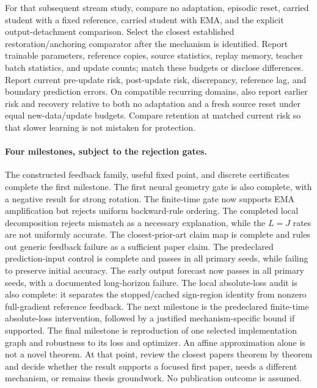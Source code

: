 \documentclass[11pt,a4paper]{article}
\begin{document}
For that subsequent stream study, compare no adaptation, episodic reset,
carried student with a fixed
reference, carried student with EMA, and the explicit output-detachment
comparison. Select the closest established restoration/anchoring comparator
after the mechanism is identified. Report trainable parameters, reference
copies, source statistics, replay memory, teacher batch statistics, and
update counts; match these budgets or disclose differences. Report current
pre-update risk, post-update risk, discrepancy, reference lag, and boundary
prediction errors. On compatible recurring domains, also report earlier
risk and recovery relative to both no adaptation and a fresh source reset
under equal new-data/update budgets. Compare retention at matched current
risk so that slower learning is not mistaken for protection.

\paragraph{Four milestones, subject to the rejection gates.}
The constructed feedback family, useful fixed point, and discrete
certificates complete the first milestone. The first neural geometry gate
is also complete, with a negative result for strong rotation. The finite-time
gate now supports EMA amplification but rejects uniform backward-rule
ordering. The completed local decomposition rejects mismatch as a
necessary explanation, while the $L=J$ rates are not uniformly
accurate. The closest-prior-art claim map is complete and rules out
generic feedback failure as a sufficient paper claim. The predeclared
prediction-input control is complete and passes in all primary seeds,
while failing to preserve initial accuracy. The early output forecast
now passes in all primary seeds, with a documented long-horizon failure.
The local absolute-loss audit is also complete: it separates the
stopped/cached sign-region identity from nonzero full-gradient reference
feedback. The next milestone is the predeclared finite-time absolute-loss
intervention, followed by a justified mechanism-specific bound if supported.
The final milestone is reproduction of one selected implementation graph
and robustness to its loss and optimizer. An affine approximation alone is not a novel theorem.
At that point, review the closest
papers theorem by theorem and decide whether the result supports a focused
first paper, needs a different mechanism, or remains thesis groundwork.
No publication outcome is assumed.
\end{document}
